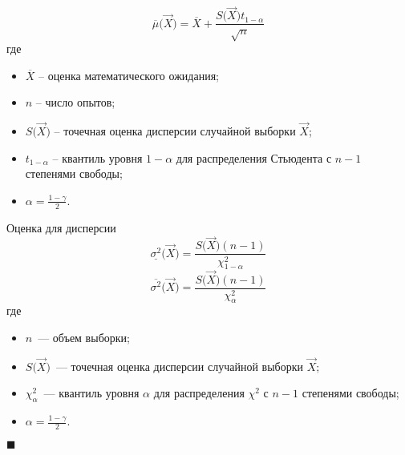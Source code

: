 \begin{equation*}
    \overline{\mu} \big( \overrightarrow X \big) = \overline X + \frac{S\big( \overrightarrow X \big) t_{1 - \alpha}}{\sqrt{n}}
\end{equation*}
где
\begin{itemize}
    \item $\overline X$ -- оценка математического ожидания;
    \item $n$ -- число опытов;
    \item $S \big( \overrightarrow X \big)$ -- точечная оценка дисперсии случайной выборки $\overrightarrow X$;
    \item $t_{1-\alpha}$ -- квантиль уровня $1 - \alpha$ для распределения Стьюдента с $n-1$ степенями свободы;
    \item $\alpha = \frac{1-\gamma}{2}$.
\end{itemize}

Оценка для дисперсии
\begin{equation*}
    \underline{\sigma^2} \big( \overrightarrow X \big) = \frac{S \big( \overrightarrow X \big) (n - 1)}{\chi^2_{1 - \alpha}}
\end{equation*}
\begin{equation*}
    \overline{\sigma^2} \big( \overrightarrow X \big) = \frac{S \big( \overrightarrow X \big) (n - 1)}{\chi^2_{\alpha}}
\end{equation*}
где
\begin{itemize}
    \item $n$~--- объем выборки;
    \item $S \big( \overrightarrow X \big)$~--- точечная оценка дисперсии случайной выборки $\overrightarrow X$;
    \item $\chi^2_\alpha$~--- квантиль уровня $\alpha$ для распределения $\chi^2$ с $n-1$ степенями свободы;
    \item $\alpha = \frac{1-\gamma}{2}$.
\end{itemize}

$\blacksquare{}$

